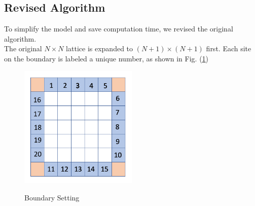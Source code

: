 \documentclass[12pt]{article}
\begin{document}
\subsection{Revised Algorithm}
To simplify the model and save computation time, we revised the original algorithm. \\
The original $N\times N$ lattice is expanded to $(N+1)\times(N+1)$ first. Each site on the boundary is labeled a unique number, as shown in Fig. (\ref{Boundary1})
\begin{figure}[H]
\centering
\includegraphics[width=0.5\textwidth]{Boundary1}
\label{Boundary1}
\caption{Boundary Setting}
\end{figure}
\end{document}
